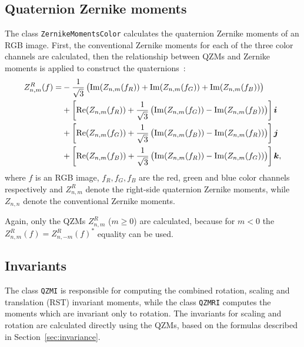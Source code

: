 \subsection{Quaternion Zernike moments}
The class \texttt{ZernikeMomentsColor} calculates the quaternion Zernike moments of an RGB image. First, the conventional Zernike moments for each of the three color channels are calculated, then the relationship between QZMs and Zernike moments is applied to construct the quaternions~\cite{qzmi}:
\begin{gather*}
    \begin{split}
        Z_{n,m}^R(f) = &-\frac{1}{\sqrt{3}}\left( \operatorname{Im}(Z_{n,m}(f_R)) + \operatorname{Im}(Z_{n,m}(f_G)) + \operatorname{Im}(Z_{n,m}(f_B)) \right)\\
        &+\left[\operatorname{Re}(Z_{n,m}(f_R)) + \frac{1}{\sqrt{3}}\left(\operatorname{Im}(Z_{n,m}(f_G)) - \operatorname{Im}(Z_{n,m}(f_B))\right)\right]\bm{i}\\
        &+\left[\operatorname{Re}(Z_{n,m}(f_G)) + \frac{1}{\sqrt{3}}\left(\operatorname{Im}(Z_{n,m}(f_B)) - \operatorname{Im}(Z_{n,m}(f_R))\right)\right]\bm{j}\\
        &+\left[\operatorname{Re}(Z_{n,m}(f_B)) + \frac{1}{\sqrt{3}}\left(\operatorname{Im}(Z_{n,m}(f_R)) - \operatorname{Im}(Z_{n,m}(f_G))\right)\right]\bm{k},\\
    \end{split}
\end{gather*}
where $f$ is an RGB image, $f_R, f_G, f_B$ are the red, green and blue color channels respectively and $Z_{n,m}^R$ denote the right-side quaternion Zernike moments, while $Z_{n,n}$ denote the conventional Zernike moments. 

Again, only the QZMs $Z_{n,m}^R$ ($m \geq 0$) are calculated, because for $m < 0$ the $Z_{n,m}^R(f) = Z_{n,-m}^R(f)^{*}$ equality can be used.

\subsection{Invariants}
The class \texttt{QZMI} is responsible for computing the combined rotation, scaling and translation (RST) invariant moments, while the class \texttt{QZMRI} computes the moments which are invariant only to rotation.
The invariants for scaling and rotation are calculated directly using the QZMs, based on the formulas described in Section~\ref{sec:invariance}.

